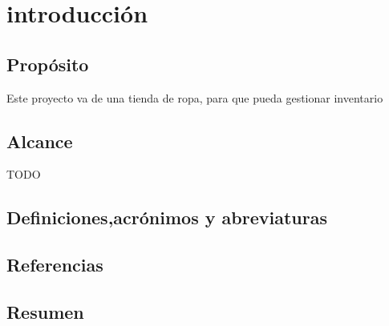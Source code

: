 \section{introducción}
\subsection{Propósito}
Este proyecto va de una tienda de ropa, para que pueda gestionar inventario
\subsection{Alcance}
TODO
\subsection{Definiciones,acrónimos y abreviaturas}
\subsection{Referencias}
\subsection{Resumen}
